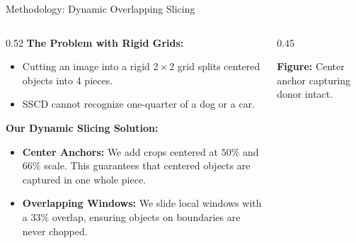 \documentclass[xcolor=table]{beamer}
\begin{document}
\begin{frame}{Methodology: Dynamic Overlapping Slicing}
  \begin{columns}[T]
    \begin{column}{0.52\textwidth}
      \textbf{The Problem with Rigid Grids:}
      \begin{itemize}
        \item Cutting an image into a rigid $2\times2$ grid splits centered objects into 4 pieces.
        \item SSCD cannot recognize one-quarter of a dog or a car.
      \end{itemize}
      \vspace{0.2cm}
      \textbf{Our Dynamic Slicing Solution:}
      \begin{itemize}
        \item \textbf{Center Anchors:} We add crops centered at $50\%$ and $66\%$ scale. This guarantees that centered objects are captured in one whole piece.
        \item \textbf{Overlapping Windows:} We slide local windows with a $33\%$ overlap, ensuring objects on boundaries are never chopped.
      \end{itemize}
    \end{column}
    \begin{column}{0.45\textwidth}
      \centering
      \vspace{0.1cm}
      {\centering\scriptsize \textbf{Figure:} Center anchor capturing donor intact.\par}
    \end{column}
  \end{columns}
\end{frame}
\end{document}
